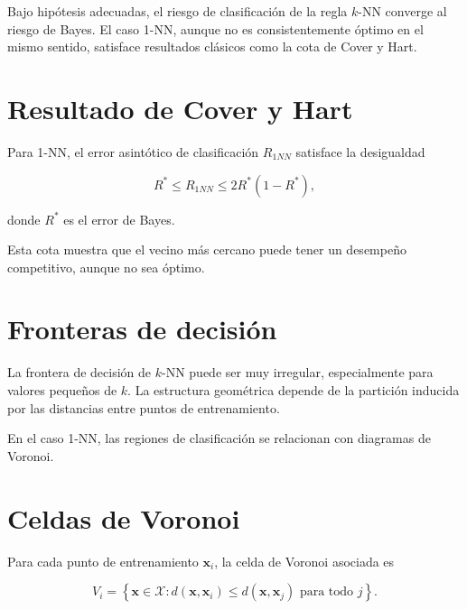 \documentclass[
  spanish,
  10.5pt,
  letterpaper,
  DIV=11,
  numbers=noendperiod,
  oneside,
  open=any]{scrreprt}
\theoremstyle{definition}
\theoremstyle{definition}
\theoremstyle{plain}
\theoremstyle{remark}
\begin{document}

Bajo hipótesis adecuadas, el riesgo de clasificación de la regla
\(k\)-NN converge al riesgo de Bayes. El caso 1-NN, aunque no es
consistentemente óptimo en el mismo sentido, satisface resultados
clásicos como la cota de Cover y Hart.

\section*{Resultado de Cover y Hart}\label{resultado-de-cover-y-hart}


Para 1-NN, el error asintótico de clasificación \(R_{1NN}\) satisface la
desigualdad

\[
R^*\le R_{1NN}\le 2R^*(1-R^*),
\]

donde \(R^*\) es el error de Bayes.

Esta cota muestra que el vecino más cercano puede tener un desempeño
competitivo, aunque no sea óptimo.

\section*{Fronteras de decisión}\label{fronteras-de-decisiuxf3n}


La frontera de decisión de \(k\)-NN puede ser muy irregular,
especialmente para valores pequeños de \(k\). La estructura geométrica
depende de la partición inducida por las distancias entre puntos de
entrenamiento.

En el caso 1-NN, las regiones de clasificación se relacionan con
diagramas de Voronoi.

\section*{Celdas de Voronoi}\label{celdas-de-voronoi}


Para cada punto de entrenamiento \(\mathbf{x}_i\), la celda de Voronoi
asociada es

\[
V_i
=
\left\{
\mathbf{x}\in\mathcal{X}:
 d(\mathbf{x},\mathbf{x}_i)
 \le
 d(\mathbf{x},\mathbf{x}_j)
 \text{ para todo } j
\right\}.
\]
\end{document}
